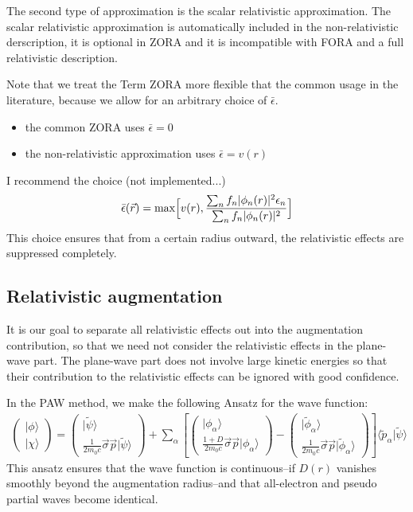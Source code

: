 \documentclass[11pt,a4paper]{report}
\begin{document}
The second type of approximation is the scalar relativistic
approximation.  The scalar relativistic approximation is automatically
included in the non-relativistic derscription, it is optional in ZORA
and it is incompatible with FORA and a full relativistic description.


Note that we treat the Term ZORA more flexible that the common usage
in the literature, because we allow for an arbitrary choice of
$\bar{\epsilon}$.
\begin{itemize}
\item the common ZORA uses $\bar{\epsilon}=0$
\item the non-relativistic approximation uses $\bar{\epsilon}=v(r)$
\end{itemize}

I recommend the choice (not implemented...)
\begin{eqnarray}
\bar{\epsilon}(\vec{r})
=
\max\Bigl[v(r),
\frac{\sum_n f_n |\phi_n(r)|^2 \epsilon_n}{\sum_n f_n |\phi_n(r)|^2}\Bigr]
\end{eqnarray}
This choice ensures that from a certain radius outward, the
relativistic effects are suppressed completely.

\subsection{Relativistic augmentation}
It is our goal to separate all relativistic effects out into the
augmentation contribution, so that we need not consider the
relativistic effects in the plane-wave part. The plane-wave part does
not involve large kinetic energies so that their contribution to the
relativistic effects can be ignored with good confidence.

In the PAW method, we make the following Ansatz for the wave function:
\begin{eqnarray}
\left(\begin{array}{c}|\phi\rangle\\|\chi\rangle\end{array}\right)
=
\left(
\begin{array}{c}|\tilde{\psi}\rangle\\\frac{1}{2m_0c}\vec{\sigma}\vec{p}|\tilde\psi\rangle\end{array}\right)
+
\sum_\alpha
\left[
\left(
\begin{array}{c}|\phi_\alpha\rangle\\
\frac{1+D}{2m_0c}\vec{\sigma}\vec{p}|\phi_\alpha\rangle\end{array}\right)
-
\left(
\begin{array}{c}|\tilde{\phi}_\alpha\rangle\\
\frac{1}{2m_0c}\vec{\sigma}\vec{p}|\tilde{\phi}_\alpha\rangle\end{array}\right)
\right]
\langle\tilde{p}_\alpha|\tilde\psi\rangle
\end{eqnarray}
This ansatz ensures that the wave function is continuous--if $D(r)$
vanishes smoothly beyond the augmentation radius--and that all-electron and
pseudo partial waves become identical. 
\end{document}
